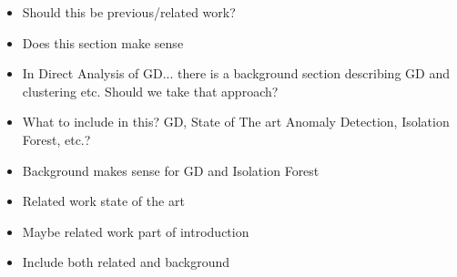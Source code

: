 \begin{itemize}
    \item Should this be previous/related work?
    \item Does this section make sense
    \item In Direct Analysis of GD... there is a background section describing GD and clustering etc. Should we take that approach?
    \item What to include in this? GD, State of The art Anomaly Detection, Isolation Forest, etc.? 
    \item Background makes sense for GD and Isolation Forest
    \item Related work state of the art
    \item Maybe related work part of introduction
    \item Include both related and background 
\end{itemize}